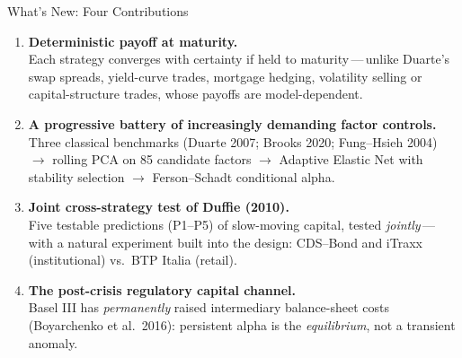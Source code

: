 \documentclass[aspectratio=169,11pt]{beamer}
\newcommand{\hlt}[1]{\textcolor{edhecred}{\textbf{#1}}}     %
\begin{document}
\begin{frame}[t]{What's New: Four Contributions}
\small
\vspace{0.15cm}

\begin{enumerate}\itemsep=0.30cm

  \item \hlt{Deterministic payoff at maturity.}\\[0.05cm]
  Each strategy converges with certainty if held to maturity\,---\,unlike
  Duarte's swap spreads, yield-curve trades, mortgage hedging, volatility selling
  or capital-structure trades, whose payoffs are model-dependent.

  \item \hlt{A progressive battery of increasingly demanding factor controls.}\\[0.05cm]
  Three classical benchmarks (Duarte 2007; Brooks 2020; Fung--Hsieh 2004)
  $\to$ rolling PCA on 85 candidate factors $\to$ Adaptive Elastic Net with
  stability selection $\to$ Ferson--Schadt conditional alpha.

  \item \hlt{Joint cross-strategy test of Duffie (2010).}\\[0.05cm]
  Five testable predictions (P1--P5) of slow-moving capital, tested
  \emph{jointly}\,---\,with a natural experiment built into the design:
  CDS--Bond and iTraxx (institutional) vs.\ BTP Italia (retail).

  \item \hlt{The post-crisis regulatory capital channel.}\\[0.05cm]
  Basel III has \emph{permanently} raised intermediary balance-sheet costs
  (Boyarchenko et al.\ 2016): persistent alpha is the \emph{equilibrium}, not
  a transient anomaly.

\end{enumerate}
\end{frame}


\end{document}
